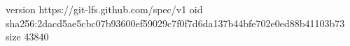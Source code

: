 version https://git-lfs.github.com/spec/v1
oid sha256:2dacd5ae5cbc07b93600ef59029c7f0f7d6da137b44bfe702e0ed88b41103b73
size 43840
